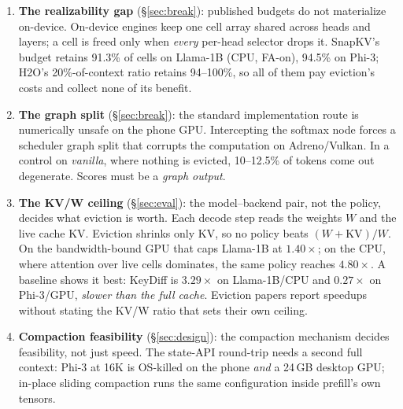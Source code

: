 \documentclass[sigconf,10pt]{acmart}
\begin{document}
\begin{enumerate}[leftmargin=*,itemsep=1pt]
\item \textbf{The realizability gap} (\S\ref{sec:break}): published budgets do not materialize on-device. On-device engines keep one cell array shared across heads and layers; a cell is freed only when \emph{every} per-head selector drops it. SnapKV's budget retains 91.3\% of cells on Llama-1B (CPU, FA-on), 94.5\% on Phi-3; H2O's 20\%-of-context ratio retains 94--100\%, so all of them pay eviction's costs and collect none of its benefit.
\item \textbf{The graph split} (\S\ref{sec:break}): the standard implementation route is numerically unsafe on the phone GPU. Intercepting the softmax node forces a scheduler graph split that corrupts the computation on Adreno/Vulkan. In a control on \emph{vanilla}, where nothing is evicted, 10--12.5\% of tokens come out degenerate. Scores must be a \emph{graph output}.
\item \textbf{The KV/W ceiling} (\S\ref{sec:eval}): the model--backend pair, not the policy, decides what eviction is worth. Each decode step reads the weights $W$ and the live cache $\mathrm{KV}$. Eviction shrinks only $\mathrm{KV}$, so no policy beats $(W{+}\mathrm{KV})/W$. On the bandwidth-bound GPU that caps Llama-1B at $1.40\times$; on the CPU, where attention over live cells dominates, the same policy reaches $4.80\times$. A baseline shows it best: KeyDiff is $3.29\times$ on Llama-1B/CPU and $0.27\times$ on Phi-3/GPU, \emph{slower than the full cache}. Eviction papers report speedups without stating the KV/W ratio that sets their own ceiling.
\item \textbf{Compaction feasibility} (\S\ref{sec:design}): the compaction mechanism decides feasibility, not just speed. The state-API round-trip needs a second full context: Phi-3 at 16K is OS-killed on the phone \emph{and} a 24\,GB desktop GPU; in-place sliding compaction runs the same configuration inside prefill's own tensors.
\end{enumerate}
\end{document}
